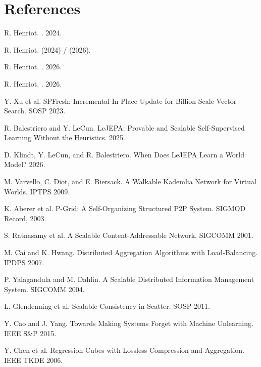 \documentclass[11pt]{article}
\begin{document}
\section*{References}
\small
\begin{enumerate}[label={[\arabic*]},leftmargin=2em,nosep]
  \item \hypertarget{reference:1}{}R. Henriot. . 2024.
  \item \hypertarget{reference:2}{}R. Henriot.  (2024) /  (2026).
  \item \hypertarget{reference:3}{}R. Henriot. . 2026.
  \item \hypertarget{reference:4}{}R. Henriot. . 2026.
  \item \hypertarget{reference:5}{}Y. Xu et al. SPFresh: Incremental In-Place Update for Billion-Scale Vector Search. SOSP 2023.
  \item \hypertarget{reference:6}{}R. Balestriero and Y. LeCun. LeJEPA: Provable and Scalable Self-Supervised Learning Without the Heuristics. 2025.
  \item \hypertarget{reference:7}{}D. Klindt, Y. LeCun, and R. Balestriero. When Does LeJEPA Learn a World Model? 2026.
  \item \hypertarget{reference:8}{}M. Varvello, C. Diot, and E. Biersack. A Walkable Kademlia Network for Virtual Worlds. IPTPS 2009.
  \item \hypertarget{reference:9}{}K. Aberer et al. P-Grid: A Self-Organizing Structured P2P System. SIGMOD Record, 2003.
  \item \hypertarget{reference:10}{}S. Ratnasamy et al. A Scalable Content-Addressable Network. SIGCOMM 2001.
  \item \hypertarget{reference:11}{}M. Cai and K. Hwang. Distributed Aggregation Algorithms with Load-Balancing. IPDPS 2007.
  \item \hypertarget{reference:12}{}P. Yalagandula and M. Dahlin. A Scalable Distributed Information Management System. SIGCOMM 2004.
  \item \hypertarget{reference:13}{}L. Glendenning et al. Scalable Consistency in Scatter. SOSP 2011.
  \item \hypertarget{reference:14}{}Y. Cao and J. Yang. Towards Making Systems Forget with Machine Unlearning. IEEE S\&P 2015.
  \item \hypertarget{reference:15}{}Y. Chen et al. Regression Cubes with Lossless Compression and Aggregation. IEEE TKDE 2006.
\end{enumerate}
\end{document}
